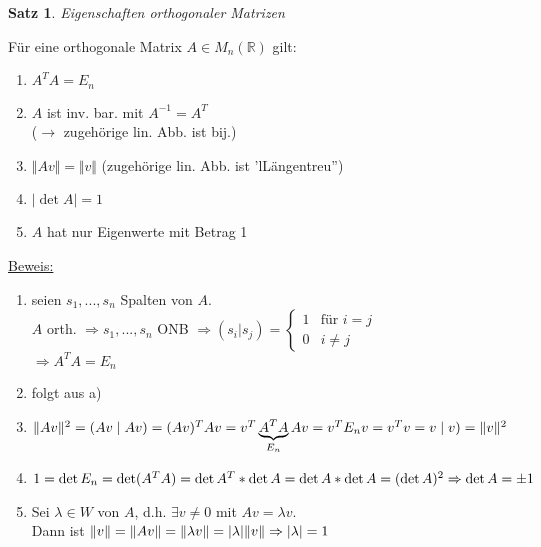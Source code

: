 \documentclass[a4paper,11pt]{article}
\newtheorem{satz}[definition]{Satz}
\begin{document}
\begin{satz}
	Eigenschaften orthogonaler Matrizen
\end{satz}
Für eine orthogonale Matrix $A\in M_n(\mathbb{R})$ gilt:
\begin{enumerate}[label=\alph*)]
	\item $A^TA=E_n$
	\item $A$ ist inv. bar. mit $A^{-1}=A^T$ \\
	($\rightarrow$ zugehörige lin. Abb. ist bij.)
	\item $\Vert Av\Vert=\Vert v\Vert$ (zugehörige lin. Abb. ist 'lLängentreu'') 
	\item $\vert\det A\vert=1$
	\item $A$ hat nur Eigenwerte mit Betrag 1
\end{enumerate}

\newpage

\underline{Beweis:}
\begin{enumerate}[label=\alph*)]
	\item seien $s_1,...,s_n$ Spalten von $A$. \\
	$A$ orth. $\Rightarrow s_1,...,s_n$ ONB $\Rightarrow(s_i\vert s_j)=\left\{\begin{array}{ll}1 & \text{für }i=j \\ 0 & i\neq j\end{array}\right.$ \\
	$\Rightarrow A^TA=E_n$
	\item folgt aus a)
	\item $\Vert Av\Vert^2=(Av\mid Av) \\
	=(Av)^TAv \\
	=v^T\underbrace{A^TA}_{E_n}Av \\
	=v^TE_nv \\
	=v^Tv \\
	=v\mid v) \\
	=\Vert v\Vert^2$
	\item$1=\det E_n=\det(A^TA) \\
	=\det A^T*\det A \\
	=\det A*\det A \\
	=(\det A)^2 \\
	\Rightarrow\det A=\pm1$
	\item Sei $\lambda\in W$ von $A$, d.h. $\exists v\neq0$ mit $Av=\lambda v$. \\
	Dann ist $\Vert v\Vert=\Vert Av\Vert \\
	=\Vert\lambda v\Vert \\
	=\vert\lambda\vert\Vert v\Vert \\
	\Rightarrow\vert\lambda\vert=1$
\end{enumerate}
\end{document}
